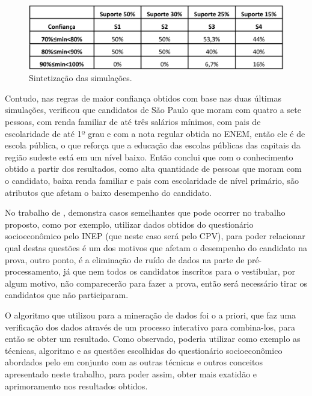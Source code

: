 \begin{figure}[!htp]
	\begin{center}
    \caption{\label{fig:waveform_fig} Sintetização das simulações.}
	\includegraphics[scale=0.49]{Figuras/Sintetizacao_simulacoes.png}
	\end{center}
\end{figure}

\par
Contudo, nas regras de maior confiança obtidos com base nas duas últimas simulações,  verificou que candidatos de São Paulo que moram com quatro a sete pessoas, com renda familiar de até três salários mínimos, com pais de escolaridade de até 1º grau e com a nota regular obtida no ENEM, então ele é de escola pública, o que reforça que a educação das escolas públicas das capitais da região sudeste está em um nível baixo. Então  conclui que com o conhecimento obtido a partir dos resultados, como alta quantidade de pessoas que moram com o candidato, baixa renda familiar e pais com escolaridade de nível primário, são atributos que afetam o baixo desempenho do candidato. 

No trabalho de , demonstra casos semelhantes que pode ocorrer no trabalho proposto, como por exemplo, utilizar dados obtidos do questionário socioeconômico pelo INEP (que neste caso será pelo CPV), para poder relacionar qual destas questões é um dos motivos que afetam o desempenho do candidato na prova, outro ponto, é a eliminação de ruído de dados na parte de pré-processamento, já que nem todos os candidatos inscritos para o vestibular, por algum motivo, não comparecerão para fazer a prova, então será necessário tirar os candidatos que não participaram.

\par
O algoritmo que  utilizou para a mineração de dados foi o a priori, que faz uma verificação dos dados através de um processo interativo para combina-los, para então se obter um resultado. Como observado, poderia utilizar como exemplo as técnicas, algoritmo e as questões escolhidas do questionário socioeconômico abordados pelo  em conjunto com as outras técnicas e outros conceitos apresentado neste trabalho, para poder assim, obter mais exatidão e aprimoramento nos resultados obtidos.

